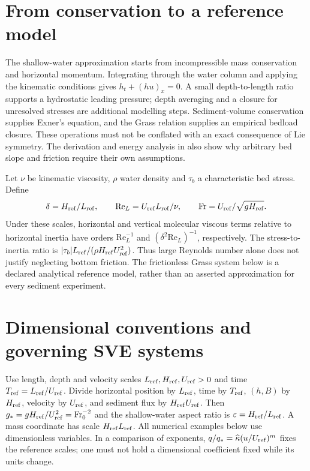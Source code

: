 \documentclass[12pt,a4paper,oneside]{report}
\numberwithin{equation}{chapter}
\theoremstyle{remark}\newtheorem{remark}[theorem]{Remark}
\begin{document}
\section{From conservation to a reference model}
The shallow-water approximation starts from incompressible mass conservation and horizontal momentum. Integrating through the water column and applying the kinematic conditions gives $h_t+(hu)_x=0$. A small depth-to-length ratio supports a hydrostatic leading pressure; depth averaging and a closure for unresolved stresses are additional modelling steps. Sediment-volume conservation supplies Exner's equation, and the Grass relation supplies an empirical bedload closure. These operations must not be conflated with an exact consequence of Lie symmetry. The derivation and energy analysis in \citet{fernandez2017} also show why arbitrary bed slope and friction require their own assumptions.

Let $\nu$ be kinematic viscosity, $\rho$ water density and $\tau_b$ a characteristic bed stress. Define
\[
 \delta=H_{\rm ref}/L_{\rm ref},\qquad
 \mathrm{Re}_L=U_{\rm ref}L_{\rm ref}/\nu,\qquad
 \mathrm{Fr}=U_{\rm ref}/\sqrt{gH_{\rm ref}}.
\]
Under these scales, horizontal and vertical molecular viscous terms relative to horizontal inertia have orders $\mathrm{Re}_L^{-1}$ and $(\delta^2\mathrm{Re}_L)^{-1}$, respectively. The stress-to-inertia ratio is $|\tau_b|L_{\rm ref}/(\rho H_{\rm ref}U_{\rm ref}^2)$. Thus large Reynolds number alone does not justify neglecting bottom friction. The frictionless Grass system below is a declared analytical reference model, rather than an asserted approximation for every sediment experiment.

\section{Dimensional conventions and governing SVE systems}
Use length, depth and velocity scales $L_{\rm ref},H_{\rm ref},U_{\rm ref}>0$ and time
$T_{\rm ref}=L_{\rm ref}/U_{\rm ref}$. Divide horizontal position by $L_{\rm ref}$, time by $T_{\rm ref}$,
$(h,B)$ by $H_{\rm ref}$, velocity by $U_{\rm ref}$, and sediment flux by $H_{\rm ref}U_{\rm ref}$.
Then $g_*=gH_{\rm ref}/U_{\rm ref}^2=\mathrm{Fr}_0^{-2}$ and the shallow-water aspect ratio
is $\varepsilon=H_{\rm ref}/L_{\rm ref}$. A mass coordinate has scale $H_{\rm ref}L_{\rm ref}$.
All numerical examples below use dimensionless variables. In a comparison
of exponents, $q/q_* =\widehat\kappa(u/U_{\rm ref})^m$ fixes the reference scales;
one must not hold a dimensional coefficient fixed while its units change.
\end{document}
